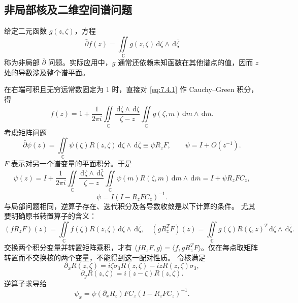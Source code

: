 \documentclass[lang=cn,scheme=chinese,mode=simple,device=normal,color=blue,math=cm,thmcnt=section,12pt]{elegantbook}
\newcommand{\dd}{\,\mathrm{d}}
\newcommand{\eqq}[2]{\tag{#1}\label{eq:#1}#2}
\begin{document}
\subsection{非局部核及二维空间谱问题}
\setcounter{definition}{2}
\begin{definition}
给定二元函数 $g(z,\zeta)$，方程
\begin{equation}
\eqq{7.4.1}{\bar\partial f(z)=\iint\limits_{\mathbb C}g(z,\zeta)\dd\zeta\wedge\dd\bar\zeta}
\end{equation}
称为非局部 $\bar\partial$ 问题。实际应用中，$g$ 通常还依赖未知函数在其他谱点的值，因而 $z$ 处的导数涉及整个谱平面。
\end{definition}
在右端可积且无穷远常数固定为 $1$ 时，直接对 \eqref{eq:7.4.1} 作 Cauchy--Green 积分，得
\[
f(z)=1+\dfrac{1}{2\pi i}\iint\limits_{\mathbb C}\dfrac{\dd\zeta\wedge\dd\bar\zeta}{\zeta-z}
\iint\limits_{\mathbb C}g(\zeta,m)\dd m\wedge\dd\bar m.
\]
考虑矩阵问题
\begin{equation}
\eqq{7.4.2}{\bar\partial\psi(z)=\iint\limits_{\mathbb C}\psi(\zeta)R(z,\zeta)\dd\zeta\wedge\dd\bar\zeta
\equiv\psi R_zF,\qquad \psi=I+O(z^{-1}).}
\end{equation}
$F$ 表示对另一个谱变量的平面积分。于是
\begin{equation}
\eqq{7.4.3}{\psi(z)=I+\dfrac{1}{2\pi i}\iint\limits_{\mathbb C}\dfrac{\dd\zeta\wedge\dd\bar\zeta}{\zeta-z}
\iint\limits_{\mathbb C}\psi(m)R(\zeta,m)\dd m\wedge\dd\bar m
=I+\psi R_zFC_z,}
\end{equation}
\begin{equation}
\eqq{7.4.4}{\psi=I(I-R_zFC_z)^{-1}.}
\end{equation}
与局部问题相同，逆算子存在、迭代积分及各导数收敛是以下计算的条件。
尤其要明确原书转置算子的含义：
\[
(fR_zF)(z)=\iint\limits_{\mathbb C}f(\zeta)R(z,\zeta)\dd\zeta\wedge\dd\bar\zeta,
\quad
(gR_z^TF)(z)=\iint\limits_{\mathbb C}g(\zeta)R(\zeta,z)^T\dd\zeta\wedge\dd\bar\zeta.
\]
交换两个积分变量并转置矩阵乘积，才有 $\langle fR_zF,g\rangle=\langle f,gR_z^TF\rangle$。仅在每点取矩阵转置而不交换核的两个变量，不能得到这一配对性质。
令核满足
\begin{equation}
\eqq{7.4.5}{\partial_xR(z,\zeta)=i\zeta\sigma_3R(z,\zeta)-izR(z,\zeta)\sigma_3,}
\end{equation}
\begin{equation}
\eqq{7.4.6}{\partial_yR(z,\zeta)=i(z-\zeta)R(z,\zeta).}
\end{equation}
逆算子求导给
\begin{equation}
\eqq{7.4.7}{\psi_x=\psi(\partial_xR_z)FC_z(I-R_zFC_z)^{-1}.}
\end{equation}
\end{document}
